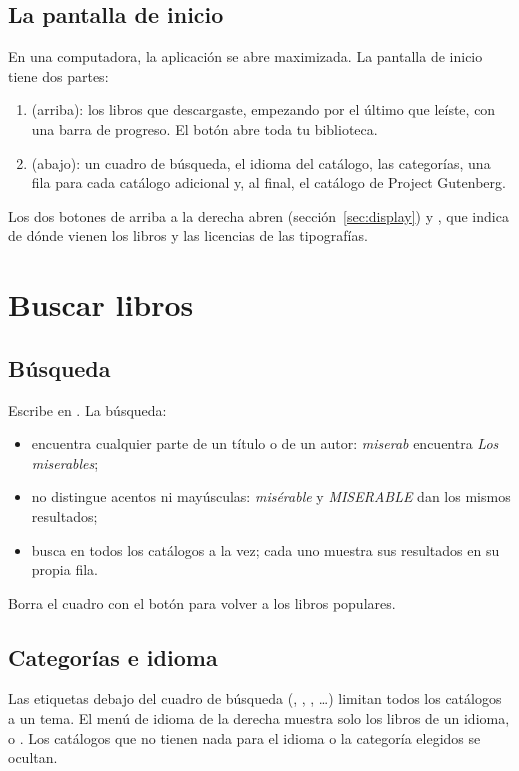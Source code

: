 \documentclass[11pt]{article}
\begin{document}
\subsection{La pantalla de inicio}
En una computadora, la aplicación se abre maximizada. La pantalla de inicio tiene dos partes:

\begin{enumerate}
  \item {} (arriba): los libros que descargaste, empezando por el último que
        leíste, con una barra de progreso. El botón  abre toda tu
        biblioteca.
  \item {} (abajo): un cuadro de búsqueda, el idioma del catálogo, las
        categorías, una fila para cada catálogo adicional y, al final, el catálogo de Project
        Gutenberg.
\end{enumerate}


Los dos botones de arriba a la derecha abren 
(sección~\ref{sec:display}) y , que indica de dónde vienen los libros y las
licencias de las tipografías.

\section{Buscar libros}

\subsection{Búsqueda}
Escribe en . La búsqueda:
\begin{itemize}
  \item encuentra cualquier parte de un título o de un autor: \emph{miserab} encuentra
        \emph{Los miserables};
  \item no distingue acentos ni mayúsculas: \emph{misérable} y \emph{MISERABLE} dan los mismos
        resultados;
  \item busca en todos los catálogos a la vez; cada uno muestra sus resultados en su propia fila.
\end{itemize}
Borra el cuadro con el botón  para volver a los libros populares.

\subsection{Categorías e idioma}
Las etiquetas debajo del cuadro de búsqueda (, , ,
…) limitan todos los catálogos a un tema. El menú de idioma de la derecha muestra solo
los libros de un idioma, o . Los catálogos que no tienen nada para el idioma
o la categoría elegidos se ocultan.
\end{document}
